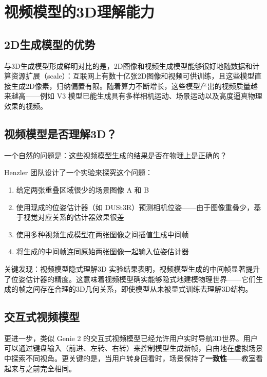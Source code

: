 \section{视频模型的3D理解能力}

\subsection{2D生成模型的优势}

与3D生成模型形成鲜明对比的是，2D图像和视频生成模型能够很好地随数据和计算资源扩展（scale）：互联网上有数十亿张2D图像和视频可供训练，且这些模型直接生成2D像素，归纳偏置有限。随着算力不断增长，这些模型产出的视频质量越来越高——例如 V3 模型已能生成具有多样相机运动、场景运动以及高度逼真物理效果的视频。

\subsection{视频模型是否理解3D？}

一个自然的问题是：这些视频模型生成的结果是否在物理上是正确的？

Henzler 团队设计了一个实验来探究这个问题：

\begin{enumerate}
    \item 给定两张重叠区域很少的场景图像 A 和 B
    \item 使用现成的位姿估计器（如 DUSt3R）预测相机位姿——由于图像重叠少，基于视觉对应关系的估计器效果很差
    \item 使用多种视频生成模型在两张图像之间插值生成中间帧
    \item 将生成的中间帧连同原始两张图像一起输入位姿估计器
\end{enumerate}

\begin{importantbox}{关键发现：视频模型隐式理解3D}
实验结果表明，视频模型生成的中间帧显著提升了位姿估计器的精度。这意味着视频模型确实能够隐式地建模物理世界——它们生成的帧之间存在合理的3D几何关系，即使模型从未被显式训练去理解3D结构。
\end{importantbox}

\subsection{交互式视频模型}

更进一步，类似 Genie 2 的交互式视频模型已经允许用户实时导航3D世界。用户可以通过键盘输入（前进、左转、右转）来控制模型生成新帧，自由地在虚拟场景中探索不同视角。更关键的是，当用户转身回看时，场景保持了\textbf{一致性}——教室看起来与之前完全相同。

